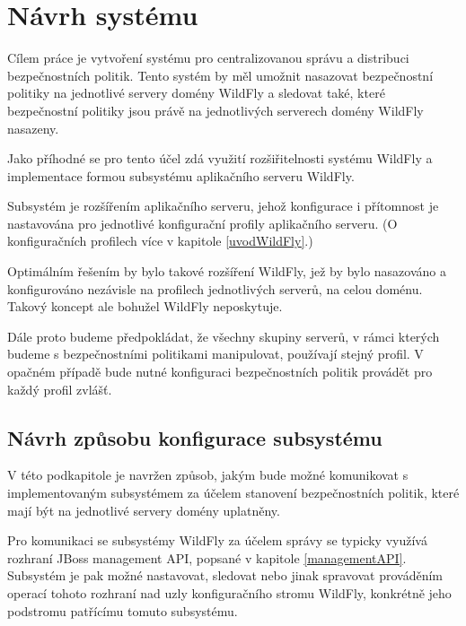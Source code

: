 \chapter{Návrh systému} \label{navrh}

Cílem práce je vytvoření systému pro centralizovanou správu a distribuci bezpečnostních politik.
Tento systém by měl umožnit nasazovat bezpečnostní politiky na jednotlivé servery domény WildFly a sledovat také,
které bezpečnostní politiky jsou právě na jednotlivých serverech domény WildFly nasazeny.

Jako příhodné se pro tento účel zdá využití rozšiřitelnosti systému WildFly a implementace formou subsystému aplikačního serveru WildFly.

Subsystém je rozšířením aplikačního serveru, jehož konfigurace i přítomnost je nastavována pro jednotlivé konfigurační profily aplikačního serveru.
(O konfiguračních profilech více v kapitole \ref{uvodWildFly}.)

Optimálním řešením by bylo takové rozšíření WildFly, jež by bylo nasazováno a konfigurováno nezávisle na profilech jednotlivých serverů, na celou doménu.
Takový koncept ale bohužel WildFly neposkytuje.

Dále proto budeme předpokládat, že všechny skupiny serverů, v rámci kterých budeme s bezpečnostními politikami manipulovat, používají stejný profil.
V opačném případě bude nutné konfiguraci bezpečnostních politik provádět pro každý profil zvlášť.

\section{Návrh způsobu konfigurace subsystému} \label{zpusobNastaveniJBoss}

V této podkapitole je navržen způsob, jakým bude možné komunikovat s implementovaným subsystémem za účelem stanovení bezpečnostních politik, které mají být na jednotlivé servery domény uplatněny.

Pro komunikaci se subsystémy WildFly za účelem správy se typicky využívá rozhraní JBoss management API, popsané v kapitole \ref{managementAPI}.
Subsystém je pak možné nastavovat, sledovat nebo jinak spravovat prováděním operací tohoto rozhraní nad uzly konfiguračního stromu WildFly,
konkrétně jeho podstromu patřícímu tomuto subsystému.
\cite{jbossDetypedManagement}

